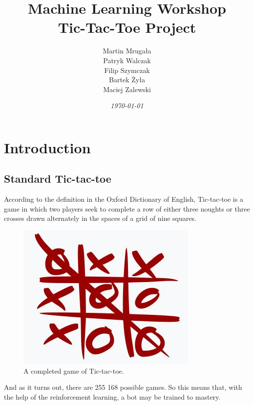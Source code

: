 \documentclass[a4paper,12pt]{book}
\begin{document}
	
	\author{Martin Mrugała\\Patryk Walczak\\Filip Szymczak\\Bartek Żyła\\Maciej Zalewski}
	\title{\Huge{\bf{Machine Learning Workshop\\Tic-Tac-Toe Project}}}
	\date{\emph{\today}}
	
	\frontmatter
	\maketitle

	\tableofcontents
	
	\mainmatter
	\chapter{Introduction}
	\section{Standard Tic-tac-toe}
	According to the definition in the Oxford Dictionary of English, Tic-tac-toe is a game in which two players seek to complete a row of either three noughts or three crosses drawn alternately in the spaces of a grid of nine squares.
		\begin{figure}[!h]
		\includegraphics{./Images/1.jpg}
		\centering
		\caption{A completed game of Tic-tac-toe\protect\footnotemark.}
		\label{fig:Capture1}
	\end{figure}
	And as it turns out, there are 255 168 possible games. So this means that, with the help of the reinforcement learning, a bot may be trained to mastery. 
	\newpage
\end{document}

